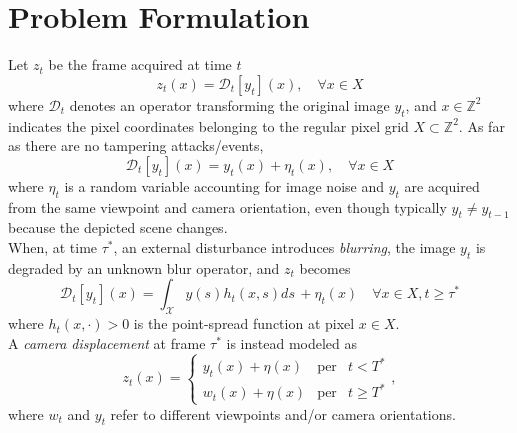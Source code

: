 \documentclass{llncs}
\begin{document}

% 
%
%
%
\section{Problem Formulation}\label{sec:probForm}
%
Let $z_t$ be the frame acquired at time $t$
\begin{equation}
\label{eq:observationModel}
z_t(x)=\mathcal{D}_t[y_t](x), \quad \forall x \in X
\end{equation}
where $\mathcal{D}_t$ denotes an operator transforming the original image $y_t$, and $x\in \mathbb{Z}^2$ indicates the pixel coordinates belonging to the regular pixel grid $X \subset \mathbb{Z}^2$. As far as there are no tampering attacks/events,
\begin{equation}
\label{eq:no_tampering}
\mathcal{D}_t[y_t](x) = y_t(x) + \eta_t(x), \quad \forall x \in X
\end{equation}
where $\eta_t$ is a random variable accounting for image noise and $y_t$ are acquired from the same viewpoint and camera orientation, even though typically $y_t \neq y_{t-1}$ because the depicted scene changes.\\
When, at time $\tau^*$, an external disturbance introduces \emph{blurring}, the image $y_t$ is degraded by an unknown blur operator, and $z_t$ becomes
\begin{equation}
\label{eq:model_defocus}
\mathcal{D}_t[y_t](x) = \int_{\mathcal{X}}y(s)h_t(x,s)ds\, + \eta_t(x) \quad \forall x \in X, t \geq \tau^*
\end{equation}
where $h_t(x,\cdot) > 0$ is the point-spread function at pixel $x \in X$.\\
A \emph{camera displacement} at frame $\tau^*$ is instead modeled as 
\begin{equation}
\label{eq:model_displacement}
z_t(x)  = \left\{ \begin{array}{rcl}
y_t(x) + \eta(x) & \mbox{per} & t < T^* \\
w_t(x) + \eta(x) & \mbox{per} & t \geqslant T^*
\end{array}\right. ,
\end{equation}
where $w_t$ and $y_t$ refer to different viewpoints and/or camera orientations.
\end{document}
